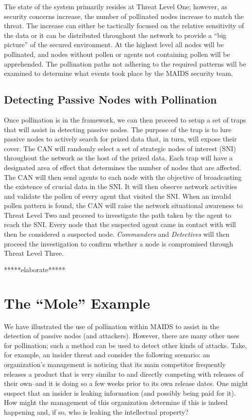 \documentclass{acm_proc_article-sp}
\begin{document}
The state of the system primarily resides at Threat Level One; however, as security concerns increase, the number of pollinated nodes increase to match the threat.  The increase can either be tactically focused on the relative sensitivity of the data or it can be distributed throughout the network to provide a ``big picture'' of the secured environment.  At the highest level all nodes will be pollinated, and nodes without pollen or agents not containing pollen will be apprehended.  The pollination paths not adhering to the required patterns will be examined to determine what events took place by the MAIDS security team.

\subsection{Detecting Passive Nodes with Pollination}
Once pollination is in the framework, we can then proceed to setup a set of traps that will assist in detecting passive nodes.  The purpose of the trap is to lure passive nodes to actively search for prized data that, in turn, will expose their cover.  The CAN will randomly select a set of strategic nodes of interest (SNI) throughout the network as the host of the prized data.  Each trap will have a designated area of effect that determines the number of nodes that are affected.  The CAN will then send agents to each node with the objective of broadcasting the existence of crucial data in the SNI.  It will then observe network activities and validate the pollen of every agent that visited the SNI.  When an invalid pollen pattern is found, the CAN will raise the network situational awareness to Threat Level Two and proceed to investigate the path taken by the agent to reach the SNI.  Every node that the suspected agent came in contact with will then be considered a suspected node.  {\it Commanders} and {\it Detectives} will then proceed the investigation to confirm whether a node is compromised through Threat Level Three.

*****elaborate*****

\section{The ``Mole'' Example}
We have illustrated the use of pollination within MAIDS to assist in the detection of passive nodes (and attackers).  However, there are many other uses for pollination; such a method can be used to detect other kinds of attacks.  Take, for example, an insider threat and consider the following scenario: an organization's management is noticing that its main competitor frequently releases a product that is very similar to and directly competing with releases of their own--and it is doing so a few weeks prior to its own release dates.  One might suspect that an insider is leaking information (and possibly being paid for it).  How might the management of this organization determine if this is indeed happening and, if so, who is leaking the intellectual property?
\end{document}
